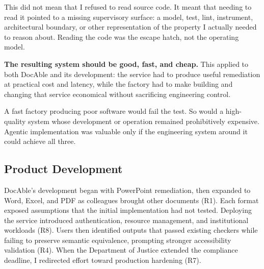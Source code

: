 
This did not mean that I refused to read source code. It meant that needing to read it pointed to a missing supervisory surface: a model, test, lint, instrument, architectural boundary, or other representation of the property I actually needed to reason about. Reading the code was the escape hatch, not the operating model.


\textbf{The resulting system should be good, fast, and cheap.} This applied to both DocAble and its development: the service had to produce useful remediation at practical cost and latency, while the factory had to make building and changing that service economical without sacrificing engineering control.


A fast factory producing poor software would fail the test. So would a high-quality system whose development or operation remained prohibitively expensive. Agentic implementation was valuable only if the engineering system around it could achieve all three.

\subsection{Product Development}\label{heading:the-build-in-stages}


DocAble's development began with PowerPoint remediation, then expanded to Word, Excel, and PDF as colleagues brought other documents (R1). Each format exposed assumptions that the initial implementation had not tested. Deploying the service introduced authentication, resource management, and institutional workloads (R8). Users then identified outputs that passed existing checkers while failing to preserve semantic equivalence, prompting stronger accessibility validation (R4). When the Department of Justice extended the compliance deadline, I redirected effort toward production hardening (R7).

